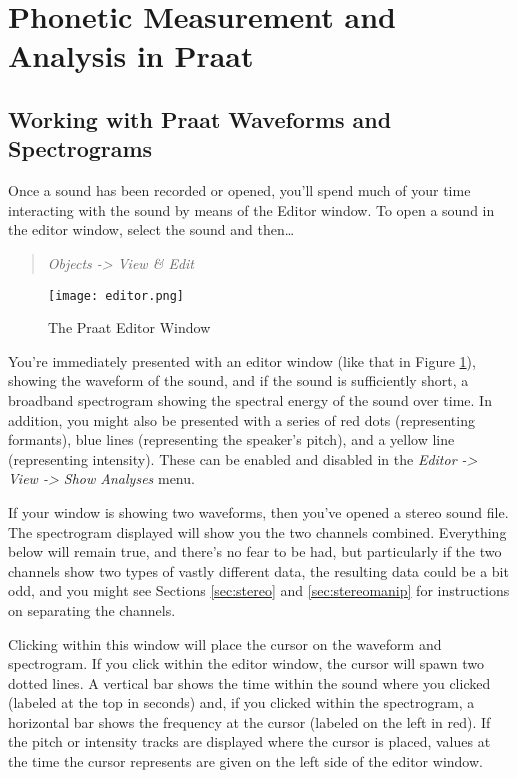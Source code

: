 \documentclass[11pt]{article}
\begin{document}
\hypertarget{phonetic-measurement-and-analysis-in-praat}{%
\section{Phonetic Measurement and Analysis in
Praat}\label{phonetic-measurement-and-analysis-in-praat}}

\hypertarget{working-with-praat-waveforms-and-spectrograms}{%
\subsection{Working with Praat Waveforms and
Spectrograms}\label{working-with-praat-waveforms-and-spectrograms}}

Once a sound has been recorded or opened, you'll spend much of your time
interacting with the sound by means of the Editor window. To open a
sound in the editor window, select the sound and then\ldots{}

\begin{quote}
\emph{Objects -\textgreater{} View \& Edit}
\end{quote}

\begin{figure}
  \centerline{
    \mbox{\texttt{[image: editor.png]}}
  }
  \caption{The Praat Editor Window \label{editor}}

  \end{figure}

You're immediately presented with an editor window (like that in Figure
\ref{editor}), showing the waveform of the sound, and if the sound is
sufficiently short, a broadband spectrogram showing the spectral energy
of the sound over time. In addition, you might also be presented with a
series of red dots (representing formants), blue lines (representing the
speaker's pitch), and a yellow line (representing intensity). These can
be enabled and disabled in the \emph{Editor -\textgreater{} View
-\textgreater{} Show Analyses} menu.

If your window is showing two waveforms, then you've opened a stereo
sound file. The spectrogram displayed will show you the two channels
combined. Everything below will remain true, and there's no fear to be
had, but particularly if the two channels show two types of vastly
different data, the resulting data could be a bit odd, and you might see
Sections \ref{sec:stereo} and \ref{sec:stereomanip} for instructions on
separating the channels.

Clicking within this window will place the cursor on the waveform and
spectrogram. If you click within the editor window, the cursor will
spawn two dotted lines. A vertical bar shows the time within the sound
where you clicked (labeled at the top in seconds) and, if you clicked
within the spectrogram, a horizontal bar shows the frequency at the
cursor (labeled on the left in red). If the pitch or intensity tracks
are displayed where the cursor is placed, values at the time the cursor
represents are given on the left side of the editor window.
\end{document}
